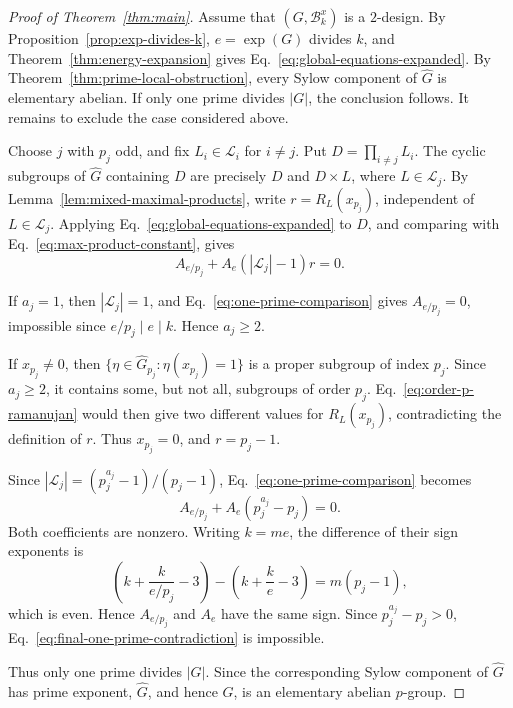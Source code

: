 \documentclass[11pt]{article}
\theoremstyle{definition}
\newcommand{\cB}{\mathcal B}
\newcommand{\cL}{\mathcal L}
\begin{document}
\begin{proof}[Proof of Theorem~\ref{thm:main}]
	Assume that \((G,\cB_k^x)\) is a \(2\)-design.  By
	Proposition~\ref{prop:exp-divides-k}, \(e=\exp(G)\) divides \(k\), and
	Theorem~\ref{thm:energy-expansion} gives
	Eq.~\eqref{eq:global-equations-expanded}.  By
	Theorem~\ref{thm:prime-local-obstruction}, every Sylow component of
	\(\widehat G\) is elementary abelian.  If only one prime divides \(|G|\),
	the conclusion follows.  It remains to exclude the case considered above.
	
	Choose \(j\) with \(p_j\) odd, and fix \(L_i\in\cL_i\) for \(i\ne j\).
	Put \(D=\prod_{i\ne j}L_i\).  The cyclic subgroups of \(\widehat G\)
	containing \(D\) are precisely \(D\) and \(D\times L\), where
	\(L\in\cL_j\).  By Lemma~\ref{lem:mixed-maximal-products}, write
	\(r=R_L(x_{p_j})\), independent of \(L\in\cL_j\).  Applying
	Eq.~\eqref{eq:global-equations-expanded} to \(D\), and comparing with
	Eq.~\eqref{eq:max-product-constant}, gives
	\begin{equation}\label{eq:one-prime-comparison}
		A_{e/p_j}+A_e(|\cL_j|-1)r=0.
	\end{equation}
	
	If \(a_j=1\), then \(|\cL_j|=1\), and
	Eq.~\eqref{eq:one-prime-comparison} gives \(A_{e/p_j}=0\), impossible
	since \(e/p_j\mid e\mid k\).  Hence \(a_j\ge2\).
	
	If \(x_{p_j}\ne 0\), then
	\(\{\eta\in\widehat G_{p_j}:\eta(x_{p_j})=1\}\) is a proper subgroup of
	index \(p_j\).  Since \(a_j\ge2\), it contains some, but not all,
	subgroups of order \(p_j\).  Eq.~\eqref{eq:order-p-ramanujan} would then
	give two different values for \(R_L(x_{p_j})\), contradicting the
	definition of \(r\).  Thus \(x_{p_j}=0\), and \(r=p_j-1\).
	
	Since \(|\cL_j|=(p_j^{a_j}-1)/(p_j-1)\),
	Eq.~\eqref{eq:one-prime-comparison} becomes
	\begin{equation}\label{eq:final-one-prime-contradiction}
		A_{e/p_j}+A_e(p_j^{a_j}-p_j)=0.
	\end{equation}
	Both coefficients are nonzero.  Writing \(k=me\), the difference of their
	sign exponents is
	\[
	\left(k+\frac{k}{e/p_j}-3\right)
	-
	\left(k+\frac{k}{e}-3\right)
	=
	m(p_j-1),
	\]
	which is even.  Hence \(A_{e/p_j}\) and \(A_e\) have the same sign.
	Since \(p_j^{a_j}-p_j>0\), Eq.~\eqref{eq:final-one-prime-contradiction}
	is impossible.
	
	Thus only one prime divides \(|G|\).  Since the corresponding Sylow
	component of \(\widehat G\) has prime exponent, \(\widehat G\), and hence
	\(G\), is an elementary abelian \(p\)-group.
\end{proof}
\end{document}

